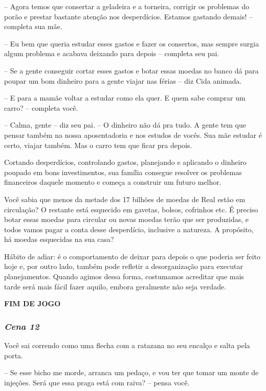 -- Agora temos que consertar a geladeira e a torneira, corrigir os problemas do porão e prestar bastante atenção nos desperdícios. Estamos gastando demais! -- completa sua mãe.

-- Eu bem que queria estudar esses gastos e fazer os consertos, mas sempre surgia algum problema e acabava deixando para depois -- completa seu pai.

-- Se a gente conseguir cortar esses gastos e botar essas moedas no banco dá para poupar um bom dinheiro para a gente viajar nas férias -- diz Cida animada.

-- E para a mamãe voltar a estudar como ela quer. E quem sabe comprar um carro? -- completa você.

-- Calma, gente -- diz seu pai. -- O dinheiro não dá pra tudo. A gente tem que pensar também na nossa aposentadoria e nos estudos de vocês. Sua mãe estudar é certo, viajar também. Mas o carro tem que ficar pra depois.

Cortando desperdícios, controlando gastos, planejando e aplicando o dinheiro poupado em bons investimentos, sua família consegue resolver os problemas financeiros daquele momento e começa a construir um futuro melhor.

Você sabia que menos da metade dos 17 bilhões de moedas de Real estão em circulação? O restante está esquecido em gavetas, bolsos, cofrinhos etc. É preciso botar essas moedas para circular ou novas moedas terão que ser produzidas, e todos vamos pagar a conta desse desperdício, inclusive a natureza. A propósito, há moedas esquecidas na sua casa?

Hábito de adiar: é o comportamento de deixar para depois o que poderia ser feito hoje e, por outro lado, também pode refletir a desorganização para executar planejamentos. Quando agimos dessa forma, costumamos acreditar que mais tarde será mais fácil fazer aquilo, embora geralmente não seja verdade.

\textbf{FIM DE JOGO}

\bigskip\medskip

\subsubsection{\textit{\textbf{Cena 12}}}
Você sai correndo como uma flecha com a ratazana no seu encalço e salta pela porta.

-- Se esse bicho me morde, arranca um pedaço, e vou ter que tomar um monte de injeções. Será que essa praga está com raiva? -- pensa você.

